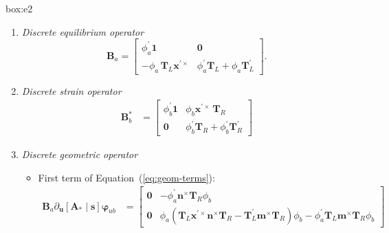 \begin{ambox}[E2]{box:e2}
\begin{enumerate}
\def\labelenumi{\arabic{enumi}.}
\item
  \emph{Discrete equilibrium operator} %
\begin{equation*}
   \bm{B}_a = \begin{bmatrix}
   \phi_a^\prime\mathbf{1} & \mathbf{0} \\
   -\phi_a \,\mathbf{T}_{\scriptscriptstyle{L}} \bm{x}^{\prime\times} & \phi_a^\prime \mathbf{T}_{\scriptscriptstyle{L}}+ \phi_a\mathbf{T}_{\scriptscriptstyle{L}}^{\prime}
   \end{bmatrix}.
   \end{equation*}
\item
  \emph{Discrete strain operator} 
  \begin{equation*}
   \begin{aligned}
   \bm{B}_b^* %
   &= \begin{bmatrix}
   \phi_b^\prime\mathbf{1} & \phi_b \bm{x}^{\prime\times} \, \mathbf{T}_{\scriptscriptstyle{R}}  \\
   \mathbf{0} & \phi_b^{\prime} \mathbf{T}_{\scriptscriptstyle{R}} +  \phi_b^{\prime} \mathbf{T}_{\scriptscriptstyle{R}}^{\prime}
   \end{bmatrix}
   \end{aligned}
   \end{equation*}
\item
  \emph{Discrete geometric operator} %
  \begin{itemize}
    \item First term of Equation~(\ref{eq:geom-terms}): %
\begin{equation*} 
   \begin{aligned}
   \bm{B}_a \partial_{\bm{u}} [\bm{A}_*\mid\bm{s}]\bm{\varphi}_{u b}
    &=\begin{bmatrix}
    \mathbf{0} & -\phi_a^{\prime} \bm{n}^\times\mathbf{T}_{\scriptscriptstyle{R}} \phi_b\\
      \mathbf{0} & \phi_a( \mathbf{T}_{\scriptscriptstyle{L}} \bm{x}^{\prime\times} \bm{n}^\times \mathbf{T}_{\scriptscriptstyle{R}}
           -  \mathbf{T}^{\prime}_{\scriptscriptstyle{L}} \bm{m}^\times \mathbf{T}_{\scriptscriptstyle{R}}) \phi_b
           - \phi_a^\prime\mathbf{T}_{\scriptscriptstyle{L}} \bm{m}^\times \mathbf{T}_{\scriptscriptstyle{R}} \phi_b 
    \end{bmatrix} \\

\end{aligned}
\end{equation*}
\end{itemize}
\end{enumerate}
\end{ambox}
